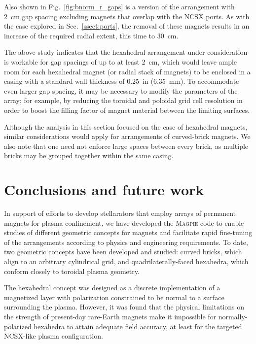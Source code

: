 \documentclass[11pt,onecolumn]{article}
\begin{document}
Also shown in Fig.~\ref{fig:bnorm_r_gaps} is a version of the arrangement
with 2~cm gap spacing excluding magnets that overlap with the NCSX ports.
As with the case explored in Sec.~\ref{ssect:ports}, the removal of these
magnets results in an increase of the required radial extent, this time
to 30~cm.

The above study indicates that the hexahedral arrangement under consideration
is workable for gap spacings of up to at least 2~cm, which would leave ample 
room for each hexahedral magnet (or radial stack of magnets) to be enclosed in 
a casing with a standard wall thickness of 0.25~in (6.35~mm). To accommodate 
even larger gap spacing, it may be necessary to modify the parameters of the 
array; for example, by reducing the toroidal and poloidal grid cell resolution 
in order to boost the filling factor of magnet material between the limiting 
surfaces. 

Although the analysis in this section focused on the case of hexahedral
magnets, similar considerations would apply for arrangements of 
curved-brick magnets.
We also note that one need not enforce large spaces between every brick,
as multiple bricks may be grouped together within the same casing.

\section{Conclusions and future work}
\label{sect:conclusions}

In support of efforts to develop stellarators that employ arrays of permanent
magnets for plasma confinement, we have developed the \textsc{Magpie} code
to enable studies of different geometric concepts for magnets and facilitate
rapid fine-tuning of the arrangements according to physics and engineering
requirements. To date, two geometric concepts have been developed and
studied: curved bricks, which align to an arbitrary cylindrical grid, and 
quadrilaterally-faced hexahedra, which conform closely to toroidal plasma 
geometry.

The hexahedral concept was designed as a discrete implementation of a
magnetized layer with polarization constrained to be normal to a surface
surrounding the plasma. However, it was found that the physical limitations
on the strength of present-day rare-Earth magnets make it impossible for
normally-polarized hexahedra to attain adequate field accuracy, at least
for the targeted NCSX-like plasma configuration.
\end{document}
